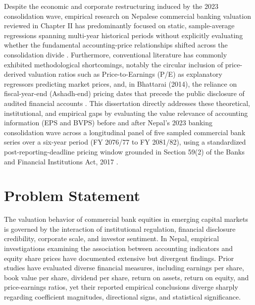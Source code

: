Despite the economic and corporate restructuring induced by the 2023 consolidation wave, empirical research on Nepalese commercial banking valuation reviewed in Chapter II has predominantly focused on static, sample-average regressions spanning multi-year historical periods without explicitly evaluating whether the fundamental accounting-price relationships shifted across the consolidation divide \citep{bhattarai2014,chaudhari2025,chhetri2023,gurungdahal2025,joshi2023,pant2024,timalsina2026}. Furthermore, conventional literature has commonly exhibited methodological shortcomings, notably the circular inclusion of price-derived valuation ratios such as Price-to-Earnings (P/E) as explanatory regressors predicting market prices, and, in Bhattarai (2014), the reliance on fiscal-year-end (Ashadh-end) pricing dates that precede the public disclosure of audited financial accounts \citep{bhattarai2014}. This dissertation directly addresses these theoretical, institutional, and empirical gaps by evaluating the value relevance of accounting information (EPS and BVPS) before and after Nepal's 2023 banking consolidation wave across a longitudinal panel of five sampled commercial bank series over a six-year period (FY 2076/77 to FY 2081/82), using a standardized post-reporting-deadline pricing window grounded in Section 59(2) of the Banks and Financial Institutions Act, 2017 \citep{bafia2017}.

\section{Problem Statement}
\label{sec:problem_statement}

The valuation behavior of commercial bank equities in emerging capital markets is governed by the interaction of institutional regulation, financial disclosure credibility, corporate scale, and investor sentiment. In Nepal, empirical investigations examining the association between accounting indicators and equity share prices have documented extensive but divergent findings. Prior studies have evaluated diverse financial measures, including earnings per share, book value per share, dividend per share, return on assets, return on equity, and price-earnings ratios, yet their reported empirical conclusions diverge sharply regarding coefficient magnitudes, directional signs, and statistical significance.

